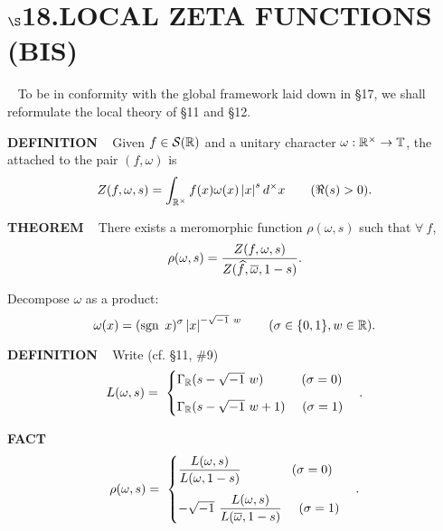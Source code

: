 \chapter{
$\boldsymbol{\S}$\textbf{18}.\quad  LOCAL ZETA FUNCTIONS (BIS)}
\setlength\parindent{2em}
\setcounter{theoremn}{0}

\ \indent 
To be in conformity with the global framework laid down in \S17, we shall reformulate the local theory of \S11 and \S12.

\vspace{0.25cm}

\begin{x}{\small\bf DEFINITION} \ %
Given $f \in \mathcal{S}(\mathbb{R})$ and a unitary character $\omega : \mathbb{R}^\times \rightarrow \mathbb{T}$, the 
attached to the pair $(f,\omega)$ is
\[
Z(f,\omega,s) = \int_{\mathbb{R}^\times} f(x) \omega(x) \left\vert x\right\vert^s d^\times x 		\qquad (\Re (s) > 0).
\]
\end{x}

\vspace{0.1cm}



\begin{x}{\small\bf THEOREM} \ %
There exists a meromorphic function $\rho(\omega,s)$ such that $\forall \ f$,
\[
\rho(\omega,s) = \frac{Z(f,\omega,s) }{Z(\widehat{f},\overline{\omega},1-s) }.
\]

Decompose $\omega$ as a product:
\[
\omega(x) = (\text{sgn}\hspace{0.05cm}\  x)^\sigma \left\vert x\right\vert^{-\sqrt{-1} \ w} \qquad (\sigma \in \{0,1\}, w \in \mathbb{R}).
\]
\end{x}
\vspace{0.1cm}


\begin{x}{\small\bf DEFINITION} \ %
Write (cf. \S11, \#9)
\[
L(\omega,s) =\ 
\begin{cases}
\Gamma_\R (s - \sqrt{-1} \ w) \quad \quad \quad (\sigma = 0)
\vspace{0.25cm}\\
\Gamma_\R (s - \sqrt{-1} \ w + 1 )  \ \quad (\sigma = 1)
\end{cases}
.
\]
\end{x}
\vspace{0.1cm}



\begin{x}{\small\bf FACT} \ %
\[
\rho(\omega,s) = \ 
\begin{cases}
\ds\frac{L(\omega,s) }{L(\omega,1-s)} \quad \quad \quad \quad (\sigma = 0)
\vspace{0.25cm}\\
-\sqrt{-1} \ \ds\frac{L(\omega,s) }{L(\ov{\omega},1-s)}  \  \quad (\sigma = 1)
\end{cases}
.\]
\end{x}
\vspace{0.1cm}




